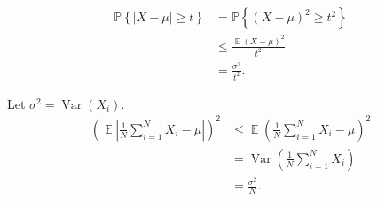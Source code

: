 \documentclass{report}
\theoremstyle{definition}
\newenvironment{exercise}[1]{
  \renewcommand\theexerciseimpl{#1}
  \exerciseimpl
}{\endexerciseimpl}
\DeclareMathOperator{\E}{\mathbb{E}}
\renewcommand{\P}[1]{\mathbb{P}\left\{#1\right\}}
\DeclareMathOperator{\Var}{\mathrm{Var}}
\begin{document}
\begin{exercise}{1.2.6}
  \begin{align*}
    \P{|X - \mu| \ge t} & = \P{(X - \mu)^2 \ge t^2} \\
    & \le \frac{\E (X - \mu)^2}{t^2} \\
    & = \frac{\sigma^2}{t^2}.
  \end{align*}
\end{exercise}

\begin{exercise}{1.3.3}
  Let $\sigma^2 = \Var(X_i)$.
  \begin{align*}
    \left(\E \left|\frac{1}{N} \sum_{i=1}^N X_i - \mu\right|\right)^2 & \le \E \left(\frac{1}{N} \sum_{i=1}^N X_i - \mu\right)^2 \tag{by Jensen's inequality} \\
    & = \Var \left(\frac{1}{N} \sum_{i=1}^N X_i\right) \\
    & = \frac{\sigma^2}{N}. \tag{by equation 1.5}
  \end{align*}
\end{exercise}
\end{document}

